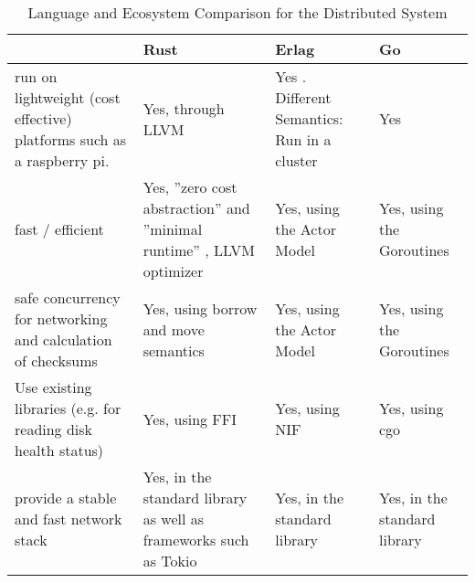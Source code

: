 \begin{sidewaystable}
	\centering
	\caption{Language and Ecosystem Comparison for the Distributed System}
	\label{language-comparison-ds}
	\begin{tabu}{X|X X X}
		\hline
		& Rust
		& Erlag
		& Go
		\\ \hline

		run on lightweight (cost effective) platforms such as a raspberry pi.
		& Yes, through LLVM \cite{rust-blog-introducing-mir}
		& Yes \cite{erlang-faq-implementations}. Different Semantics: Run in a cluster
		& Yes \cite{go-github-minimum-requirements}
		\\
		
		fast / efficient
		& Yes, ''zero cost abstraction'' and ''minimal runtime'' \cite{rustlang-org}, LLVM optimizer \cite{rust-blog-introducing-mir}
		& Yes, using the Actor Model \cite{hebert_learn_you_some_erlang}
		& Yes, using the Goroutines \cite{doxsey_introduction_2012}
		\\
		
		safe concurrency for networking and calculation of checksums
		& Yes, using borrow and move semantics \cite{rust-book-concurrency}
		& Yes, using the Actor Model \cite{hebert_learn_you_some_erlang}
        & Yes, using the Goroutines \cite{doxsey_introduction_2012}
		\\
		
		Use existing libraries (e.g. for reading disk health status)
		& Yes, using FFI \cite{rust-book-concurrency}
		& Yes, using NIF \cite{erlang-org-nif}
		& Yes, using cgo \cite{golang-org-cgo}
		\\
		
		provide a stable and fast network stack
		& Yes, in the standard library as well as frameworks such as Tokio \cite{tokio-rs}
		& Yes, in the standard library \cite{erlang-org}
		& Yes, in the standard library \cite{golang-org}
		\\
		
	\end{tabu}
\end{sidewaystable}

